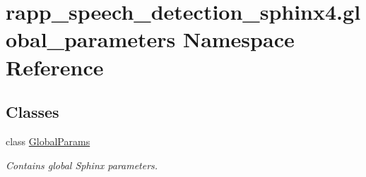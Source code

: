 \hypertarget{namespacerapp__speech__detection__sphinx4_1_1global__parameters}{\section{rapp\-\_\-speech\-\_\-detection\-\_\-sphinx4.\-global\-\_\-parameters Namespace Reference}
\label{namespacerapp__speech__detection__sphinx4_1_1global__parameters}
}
\subsection*{Classes}
\begin{DoxyCompactItemize}
\item 
class \hyperlink{classrapp__speech__detection__sphinx4_1_1global__parameters_1_1GlobalParams}{Global\-Params}
\begin{DoxyCompactList}\small\item\em Contains global Sphinx parameters. \end{DoxyCompactList}\end{DoxyCompactItemize}
